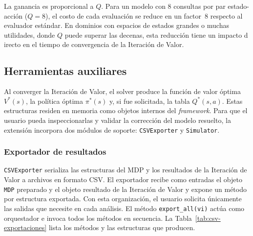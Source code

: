 La ganancia es proporcional a $Q$. Para un modelo con 8 consultas por par
estado-acción ($Q = 8$), el costo de cada evaluación se reduce en un factor~8
respecto al evaluador estándar. En dominios con espacios de estados grandes o
muchas utilidades, donde $Q$ puede superar las decenas, esta reducción tiene un
impacto d
irecto en el tiempo de convergencia de la Iteración de Valor.

\clearpage

\subsection{Herramientas auxiliares}
\label{sec:di-herramientas}

Al converger la Iteración de Valor, el solver produce la función de valor óptima
$V^*(s)$, la política óptima $\pi^*(s)$ y, si fue solicitada, la tabla $Q^*(s,a)$.
Estas estructuras residen en memoria como objetos internos del \textit{framework}.
Para que el usuario pueda inspeccionarlas y validar la corrección del modelo
resuelto, la extensión incorpora dos módulos de soporte: \texttt{CSVExporter} y
\texttt{Simulator}.

\subsubsection{Exportador de resultados}
\label{sec:di-csv-exporter}

\texttt{CSVExporter} serializa las estructuras del MDP y los resultados de la
Iteración de Valor a archivos en formato CSV. El exportador recibe como entradas
el objeto \texttt{MDP} preparado y el objeto resultado de la Iteración de Valor y expone un método por estructura exportada.
 Con esta organización, el usuario solicita únicamente las salidas que necesite
en cada análisis. El método
\texttt{export\_all(vi)} actúa como orquestador e invoca todos los métodos en
secuencia. La Tabla~\ref{tab:csv-exportaciones} lista los métodos y las estructuras que producen.

